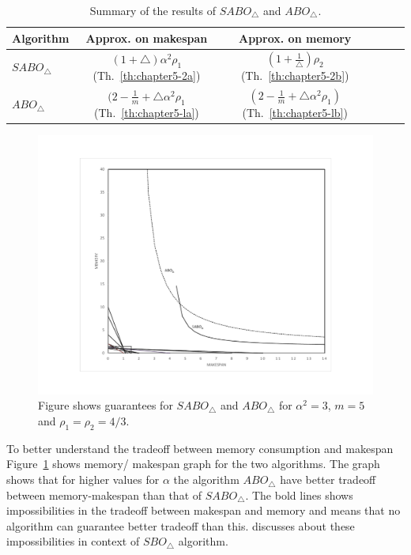   \begin{table}[ht]
      \centering
      \begin{tabular}{|l|c|c|c|c|c|}
        \hline
        Algorithm & Approx. on makespan & Approx. on memory  \\
        \hline
        $SABO_\triangle$&
        $(1+\triangle)\alpha^2 \rho_1$ (Th.~\ref{th:chapter5-2a})& $(1+\frac{1}{\triangle})\rho_2$ (Th.~\ref{th:chapter5-2b})   \\
        \hline
                $ABO_\triangle$&
                $(2-\frac{1}{m}+\triangle\alpha^2 \rho_1$ (Th.~\ref{th:chapter5-la})& $(2-\frac{1}{m}+\triangle\alpha^2 \rho_1)$ (Th.~\ref{th:chapter5-lb})   \\
        
        
        
        
        \hline
      \end{tabular}
      \caption{Summary of the results of $SABO_\triangle$ and $ABO_\triangle$.}
      \label{tab:template2}
    \end{table}
  
  
  \begin{figure}[htp]
    \centering
    \includegraphics[width= 12 cm]{g5.pdf}
    \caption{Figure shows guarantees for $SABO_\triangle$ and $ABO_\triangle$ for $\alpha^2 =3$, $m=5$ and $\rho_1=\rho_2=4/3$.}
    \label{fig:6}
    \end{figure}
    
 To better understand the tradeoff between memory consumption and makespan Figure~\ref{fig:6} shows memory/ makespan graph for the two algorithms. The graph shows that for higher values for $\alpha$ the  algorithm $ABO_\triangle$ have better tradeoff between memory-makespan than that of  $SABO_\triangle$. The bold lines shows impossibilities in the tradeoff between makespan and memory and means that no algorithm can guarantee better tradeoff than this. \cite{10.1109/IPDPS.2008.4536292} discusses about these impossibilities in context of $SBO_\triangle$ algorithm.
  
              
               
               
        